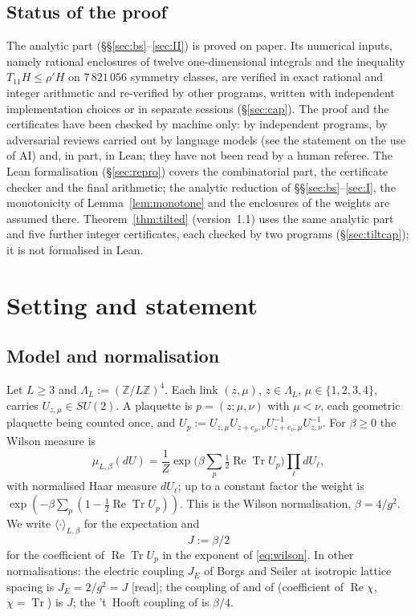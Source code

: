 \documentclass[11pt,a4paper]{article}
\theoremstyle{plain}
\theoremstyle{remark}
\numberwithin{equation}{section}
\newcommand{\Z}{\mathbb{Z}}
\newcommand{\Tr}{\operatorname{Tr}}
\newcommand{\ReTr}{\operatorname{Re}\operatorname{Tr}}
\newcommand{\st}[1]{\textsf{[#1]}}
\begin{document}
\subsection{Status of the proof}\label{sec:status}
The analytic part (\S\S\ref{sec:bs}--\ref{sec:II}) is proved on paper. Its numerical inputs, namely rational enclosures of twelve
one-dimensional integrals and the inequality $T_{11}H\le\rho'H$ on $7\,821\,056$ symmetry classes, are verified in exact rational and
integer arithmetic and re-verified by other programs, written with independent implementation choices or in separate sessions
(\S\ref{sec:cap}). The proof and the certificates have been
checked by machine only: by independent programs, by adversarial reviews carried out by language models (see the statement on the
use of AI) and, in part, in Lean; they have not been read by a human referee. The Lean formalisation (\S\ref{sec:repro}) covers the
combinatorial part, the certificate checker and the final arithmetic; the analytic reduction of \S\S\ref{sec:bs}--\ref{sec:I}, the
monotonicity of Lemma~\ref{lem:monotone} and the enclosures of the weights are assumed there. Theorem~\ref{thm:tilted}
(version~1.1) uses the same analytic part and five further integer certificates, each checked by two programs
(\S\ref{sec:tiltcap}); it is not formalised in Lean.

\section{Setting and statement}\label{sec:statement}

\subsection{Model and normalisation}
Let $L\ge3$ and $\Lambda_L:=(\Z/L\Z)^4$. Each link $(z,\mu)$, $z\in\Lambda_L$, $\mu\in\{1,2,3,4\}$, carries $U_{z,\mu}\in SU(2)$.
A plaquette is $p=(z;\mu,\nu)$ with $\mu<\nu$, each geometric plaquette being counted once, and
$U_p:=U_{z,\mu}U_{z+e_\mu,\nu}U_{z+e_\nu,\mu}^{-1}U_{z,\nu}^{-1}$. For $\beta\ge0$ the Wilson measure is
\begin{equation}\label{eq:wilson}
\mu_{L,\beta}(dU)=\frac1Z\exp\Big(\beta\sum_p\tfrac12\ReTr U_p\Big)\prod_\ell dU_\ell ,
\end{equation}
with normalised Haar measure $dU_\ell$; up to a constant factor the weight is $\exp(-\beta\sum_p(1-\frac12\ReTr U_p))$. This is the
Wilson normalisation, $\beta=4/g^2$. We write $\langle\cdot\rangle_{L,\beta}$ for the expectation and
\begin{equation}\label{eq:J}
J:=\beta/2
\end{equation}
for the coefficient of $\ReTr U_p$ in the exponent of \eqref{eq:wilson}. In other normalisations: the electric coupling $J_E$ of
Borgs and Seiler \cite[(II.2)--(II.4), p.~332]{BS83} at isotropic lattice spacing is $J_E=2/g^2=J$ \st{read}; the coupling of
\cite[(1.13)--(1.16)]{DF80} and of \cite{Fro79} (coefficient of $\operatorname{Re}\chi$, $\chi=\Tr$) is $J$; the 't~Hooft coupling of
\cite{CNS25} is $\beta/4$.
\end{document}
